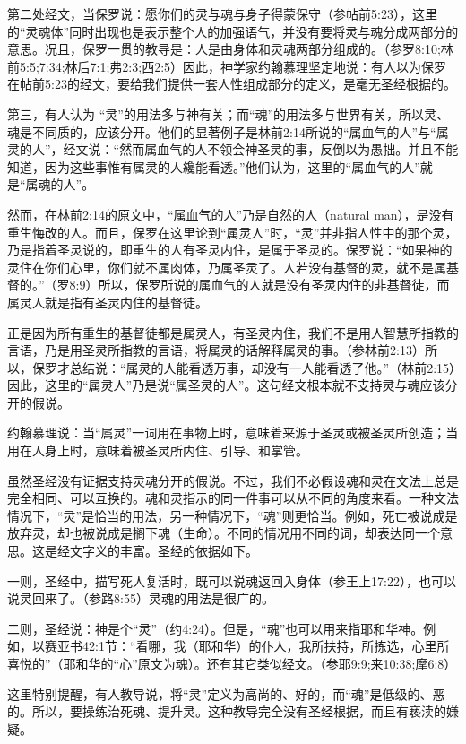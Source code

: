 第二处经文，当保罗说：愿你们的灵与魂与身子得蒙保守（参帖前5:23），这里的“灵魂体”同时出现也是表示整个人的加强语气，并没有要将灵与魂分成两部分的意思。况且，保罗一贯的教导是：人是由身体和灵魂两部分组成的。（参罗8:10;林前5:5;7:34;林后7:1;弗2:3;西2:5）因此，神学家约翰慕理坚定地说：有人以为保罗在帖前5:23的经文，要给我们提供一套人性组成部分的定义，是毫无圣经根据的。

第三，有人认为  “灵”的用法多与神有关；而“魂”的用法多与世界有关，所以灵、魂是不同质的，应该分开。他们的显著例子是林前2:14所说的“属血气的人”与“属灵的人”，经文说：“然而属血气的人不领会神圣灵的事，反倒以为愚拙。并且不能知道，因为这些事惟有属灵的人纔能看透。”他们认为，这里的“属血气的人”就是“属魂的人”。

然而，在林前2:14的原文中，“属血气的人”乃是自然的人（natural man），是没有重生悔改的人。而且，保罗在这里论到“属灵人”时，“灵”并非指人性中的那个灵，乃是指着圣灵说的，即重生的人有圣灵内住，是属于圣灵的。保罗说：“如果神的灵住在你们心里，你们就不属肉体，乃属圣灵了。人若没有基督的灵，就不是属基督的。”（罗8:9）所以，保罗所说的属血气的人就是没有圣灵内住的非基督徒，而属灵人就是指有圣灵内住的基督徒。

正是因为所有重生的基督徒都是属灵人，有圣灵内住，我们不是用人智慧所指教的言语，乃是用圣灵所指教的言语，将属灵的话解释属灵的事。（参林前2:13）所以，保罗才总结说：“属灵的人能看透万事，却没有一人能看透了他。”（林前2:15）因此，这里的“属灵人”乃是说“属圣灵的人”。这句经文根本就不支持灵与魂应该分开的假说。

约翰慕理说：当“属灵”一词用在事物上时，意味着来源于圣灵或被圣灵所创造；当用在人身上时，意味着被圣灵所内住、引导、和掌管。

虽然圣经没有证据支持灵魂分开的假说。不过，我们不必假设魂和灵在文法上总是完全相同、可以互换的。魂和灵指示的同一件事可以从不同的角度来看。一种文法情况下，“灵”是恰当的用法，另一种情况下，“魂”则更恰当。例如，死亡被说成是放弃灵，却也被说成是搁下魂（生命）。不同的情况用不同的词，却表达同一个意思。这是经文字义的丰富。圣经的依据如下。

一则，圣经中，描写死人复活时，既可以说魂返回入身体（参王上17:22），也可以说灵回来了。（参路8:55）灵魂的用法是很广的。

二则，圣经说：神是个“灵”（约4:24）。但是，“魂”也可以用来指耶和华神。例如，以赛亚书42:1节：“看哪，我（耶和华）的仆人，我所扶持，所拣选，心里所喜悦的”（耶和华的“心”原文为魂）。还有其它类似经文。（参耶9:9;来10:38;摩6:8）

这里特别提醒，有人教导说，将“灵”定义为高尚的、好的，而“魂”是低级的、恶的。所以，要操练治死魂、提升灵。这种教导完全没有圣经根据，而且有亵渎的嫌疑。

